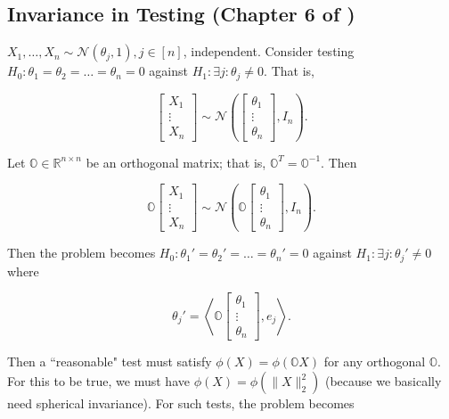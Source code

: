 \subsection{Invariance in Testing (Chapter 6 of \citet{lehmann2005testing})}

\begin{example}

\(X_1, \ldots, X_n \sim \mathcal{N}(\theta_j, 1), j \in [n]\), independent. Consider testing \(H_0: \theta_1 = \theta_2 = \ldots = \theta_n = 0\) against \(H_1: \exists j : \theta_j \neq 0\).  That is,

\[
\begin{bmatrix}
X_1 \\
\vdots \\
X_n
\end{bmatrix} \sim \mathcal{N} \left( 
\begin{bmatrix}
\theta_1 \\
\vdots \\
\theta_n 
\end{bmatrix}, I_n\right).
\]


Let \(\mathbb{O} \in \mathbb{R}^{n \times n}\) be an orthogonal matrix; that is, \(\mathbb{O}^T = \mathbb{O}^{-1}\). Then 

\[
\mathbb{O}\begin{bmatrix}
X_1 \\
\vdots \\
X_n
\end{bmatrix} \sim \mathcal{N} \left( 
\mathbb{O} \begin{bmatrix}
\theta_1 \\
\vdots \\
\theta_n 
\end{bmatrix}, I_n\right) .
\]

Then the problem becomes  \(H_0: \theta_1' = \theta_2' = \ldots = \theta_n' = 0\) against \(H_1: \exists j : \theta_j' \neq 0\) where 

\[
\theta_j' = \left\langle \mathbb{O} \begin{bmatrix}
\theta_1 \\
\vdots \\
\theta_n 
\end{bmatrix}, e_j  \right\rangle.
\]

Then a ``reasonable" test must satisfy \(\phi(X) = \phi(\mathbb{O}X)\) for any orthogonal \(\mathbb{O}\). For this to be true, we must have \(\phi(X) = \phi(\lVert X \rVert_2^2)\) (because we basically need spherical invariance). For such tests, the problem becomes 


\end{example}
